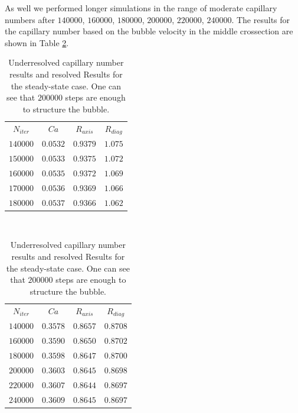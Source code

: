 \documentclass{article}
\begin{document}
As well we performed longer simulations in the range of moderate capillary numbers after
$140000$, $160000$, $180000$, $200000$, $220000$, $240000$. The results for the capillary number
based on the bubble velocity in the middle crossection are shown in Table \ref{table:steady:state}. 
\begin{table}
\begin{center}
\begin{tabular}{|c|c|c|c|}
\hline
$N_{iter}$&$Ca$&$R_{axis}$&$R_{diag}$\\
$140000$&$0.0532$&$0.9379$&$1.075$\\
$150000$&$0.0533$&$0.9375$&$1.072$\\
$160000$&$0.0535$&$0.9372$&$1.069$\\
$170000$&$0.0536$&$0.9369$&$1.066$\\
$180000$&$0.0537$&$0.9366$&$1.062$\\
\hline
\end{tabular}\\
\begin{tabular}{|c|c|c|c|}
\hline
$N_{iter}$&$Ca$&$R_{axis}$&$R_{diag}$\\
$140000$&$0.3578$&$0.8657$&$0.8708$\\
$160000$&$0.3590$&$0.8650$&$0.8702$\\
$180000$&$0.3598$&$0.8647$&$0.8700$\\
$200000$&$0.3603$&$0.8645$&$0.8698$\\
$220000$&$0.3607$&$0.8644$&$0.8697$\\
$240000$&$0.3609$&$0.8645$&$ 0.8697$\\
\hline
\end{tabular}
\end{center}
\caption{Underresolved capillary number results and resolved Results for the steady-state case. One
can see that $200000$ steps are enough to structure
the bubble. \label{table:steady:state}}
\end{table}

\end{document}
